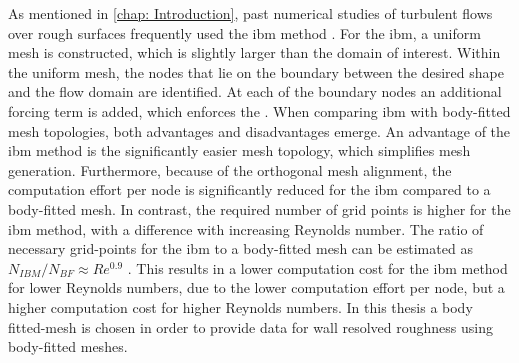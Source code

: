 As mentioned in \autoref{chap: Introduction}, past numerical studies of turbulent flows over rough surfaces frequently used the \acrshort{ibm} method \citep{demaioDirectNumericalSimulation2023,busseReynoldsnumberDependenceNearwall2017,thakkarSurfaceCorrelationsHydrodynamic2017,frohnapfelFlowResistanceHeterogeneous2024}.
For the \acrshort{ibm}, a uniform mesh is constructed, which is slightly larger than the domain of interest.
Within the uniform mesh, the nodes that lie on the boundary between the desired shape and the flow domain are identified.
At each of the boundary nodes an additional forcing term is added, which enforces the  \citep{verziccoImmersedBoundaryMethods2023}.
When comparing \acrshort{ibm} with body-fitted mesh topologies, both advantages and disadvantages emerge.
An advantage of the \acrshort{ibm} method is the significantly easier mesh topology, which simplifies mesh generation.
Furthermore, because of the orthogonal mesh alignment, the computation effort per node is significantly reduced for the \acrshort{ibm} compared to a body-fitted mesh.
In contrast, the required number of grid points is higher for the \acrshort{ibm} method, with a difference with increasing Reynolds number.
The ratio of necessary grid-points for the \acrshort{ibm} to a body-fitted mesh can be estimated as $N_{IBM}/N_{BF}\approx Re^{0.9}$ \citep{verziccoImmersedBoundaryMethods2023}.
This results in a lower computation cost for the \acrshort{ibm} method for lower Reynolds numbers, due to the lower computation effort per node, but a higher computation cost for higher Reynolds numbers.
In this thesis a body fitted-mesh is chosen in order to provide data for wall resolved roughness using body-fitted meshes.

